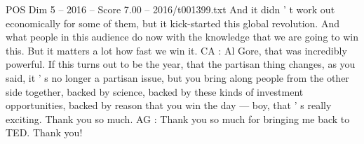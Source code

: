 \begin{textsample}{POS Dim 5 – 2016 – Score 7.00 – 2016/t001399.txt}
And it didn ' t work out economically for some of them, but it kick-started this global revolution.
And what people in this audience do now with the knowledge that we are going to win this.
But it matters a lot how fast we win it.
CA : Al Gore, that was incredibly powerful.
If this turns out to be the year, that the partisan thing changes, as you said, it ' s no longer a partisan issue, but you bring along people from the other side together, backed by science, backed by these kinds of investment opportunities, backed by reason that you win the day — boy, that ' s really exciting.
Thank you so much.
AG : Thank you so much for bringing me back to TED.
Thank you!

\end{textsample}
